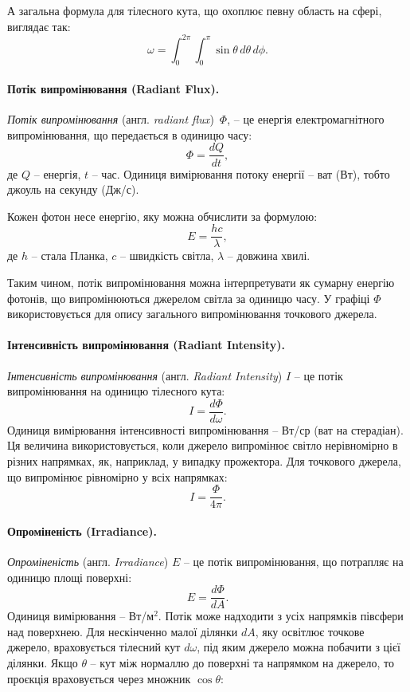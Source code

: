 А загальна формула для тілесного кута, що охоплює певну область на сфері, виглядає так:
\begin{equation}
\label{eq:SolidAngle}
\omega = \int_0^{2\pi} \int_0^{\pi} \sin{\theta} \, d\theta \, d\phi.
\end{equation}

\paragraph{Потік випромінювання (Radiant Flux).}
\textit{Потік випромінювання} \linebreak (англ. \textit{radiant flux})~$\Phi$, -- це енергія електромагнітного випромінювання, що пе\-ре\-дає\-ть\-ся в одиницю часу:
\[
\Phi = \frac{dQ}{dt},
\]
де $Q$ -- енергія, $t$ -- час. Одиниця вимірювання потоку енергії -- ват (Вт), тобто джоуль на секунду (Дж/с).

Кожен фотон несе енергію, яку можна обчислити за формулою:
\[
E = \frac{hc}{\lambda},
\]
де $h$ -- стала Планка, $c$ -- швидкість світла, $\lambda$ -- довжина хвилі.

Таким чином, потік випромінювання можна інтерпретувати як сумарну енергію фотонів, що випромінюються джерелом світла за одиницю часу. У графіці $\Phi$ 
використовується для опису загального випромінювання точкового джерела.

\paragraph{Інтенсивність випромінювання (Radiant Intensity).}
\textit{Інтенсивність} \linebreak \textit{вип\-ро\-мі\-ню\-ван\-ня} (англ. \textit{Radiant Intensity})  $I$ -- це потік випромінювання на одиницю тілесного кута:
\[
I = \frac{d\Phi}{d\omega}.
\]
Одиниця вимірювання інтенсивності випромінювання -- Вт/ср (ват на стерадіан). Ця величина використовується, коли джерело випромінює світло нерівномірно в різних напрямках, як, наприклад, 
у випадку прожектора. Для точкового джерела, що випромінює рівномірно у всіх напрямках:
\[
I = \frac{\Phi}{4\pi}.
\]

\paragraph{Опроміненість (Irradiance).}
\textit{Опроміненість} (англ. \textit{Irradiance}) $E$ -- це потік випромінювання, що потрапляє на одиницю площі поверхні:
\[
E = \frac{d\Phi}{dA}.
\]
Одиниця вимірювання -- Вт/м$^2$. Потік може надходити з усіх напрямків півсфери над поверхнею. Для нескінченно малої ділянки $dA$, яку 
освітлює точ\-ко\-ве джерело, враховується тілесний кут $d\omega$, під яким джерело можна побачити з цієї ділянки. Якщо $\theta$ -- кут між нормаллю до 
поверхні та напрямком на джерело, то проєкція враховується через множник $\cos{\theta}$:

